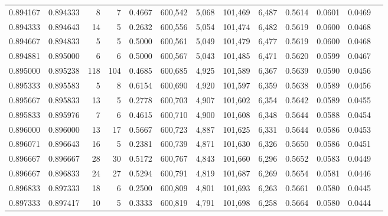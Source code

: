 \begin{tabular}{rrrrrrrrrrrrr}
0.894167 & 0.894333 &     8 &   7 &                                     0.4667 & 600,542 &   5,068 & 101,469 &   6,487 & 0.5614 & 0.0601 & 0.0469 \\
0.894333 & 0.894643 &    14 &   5 &                                     0.2632 & 600,556 &   5,054 & 101,474 &   6,482 & 0.5619 & 0.0600 & 0.0468 \\
0.894667 & 0.894833 &     5 &   5 &                                     0.5000 & 600,561 &   5,049 & 101,479 &   6,477 & 0.5619 & 0.0600 & 0.0468 \\
0.894881 & 0.895000 &     6 &   6 &                                     0.5000 & 600,567 &   5,043 & 101,485 &   6,471 & 0.5620 & 0.0599 & 0.0467 \\
0.895000 & 0.895238 &   118 & 104 &                                     0.4685 & 600,685 &   4,925 & 101,589 &   6,367 & 0.5639 & 0.0590 & 0.0456 \\
0.895333 & 0.895583 &     5 &   8 &                                     0.6154 & 600,690 &   4,920 & 101,597 &   6,359 & 0.5638 & 0.0589 & 0.0456 \\
0.895667 & 0.895833 &    13 &   5 &                                     0.2778 & 600,703 &   4,907 & 101,602 &   6,354 & 0.5642 & 0.0589 & 0.0455 \\
0.895833 & 0.895976 &     7 &   6 &                                     0.4615 & 600,710 &   4,900 & 101,608 &   6,348 & 0.5644 & 0.0588 & 0.0454 \\
0.896000 & 0.896000 &    13 &  17 &                                     0.5667 & 600,723 &   4,887 & 101,625 &   6,331 & 0.5644 & 0.0586 & 0.0453 \\
0.896071 & 0.896643 &    16 &   5 &                                     0.2381 & 600,739 &   4,871 & 101,630 &   6,326 & 0.5650 & 0.0586 & 0.0451 \\
0.896667 & 0.896667 &    28 &  30 &                                     0.5172 & 600,767 &   4,843 & 101,660 &   6,296 & 0.5652 & 0.0583 & 0.0449 \\
0.896667 & 0.896833 &    24 &  27 &                                     0.5294 & 600,791 &   4,819 & 101,687 &   6,269 & 0.5654 & 0.0581 & 0.0446 \\
0.896833 & 0.897333 &    18 &   6 &                                     0.2500 & 600,809 &   4,801 & 101,693 &   6,263 & 0.5661 & 0.0580 & 0.0445 \\
0.897333 & 0.897417 &    10 &   5 &                                     0.3333 & 600,819 &   4,791 & 101,698 &   6,258 & 0.5664 & 0.0580 & 0.0444 \\

\end{tabular}
